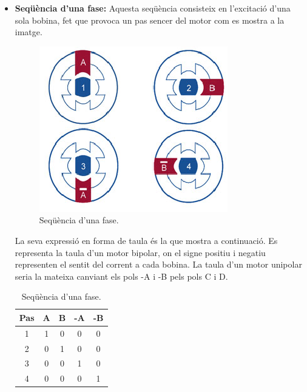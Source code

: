 \begin{itemize}
	\item \textbf{Seqüència d'una fase:} Aquesta seqüència consisteix en l'excitació d'una sola bobina, fet que provoca un pas sencer del motor com es mostra a la imatge.  
	\begin{figure}[H]
		\centering
		\includegraphics[scale=1.2]{Sequencia_1_fase.eps}
		\caption{Seqüència d'una fase.}
		\label{fig:1fase}
	\end{figure}
	La seva expressió en forma de taula és la que mostra a continuació. Es representa la taula d'un motor bipolar, on el signe positiu i negatiu representen el sentit del corrent a cada bobina. La taula d'un motor unipolar seria la mateixa canviant els pols -A i -B pels pols C i D.
	
	\begin{table}[H]
		\begin{center}
			\begin{tabular}{|c||c|c|c|c|}
				\hline
				Pas & A & B & -A & -B \\
				\hline \hline
				1 & 1 & 0 & 0 & 0 \\ \hline
				2 & 0 & 1 & 0 & 0 \\ \hline
				3 & 0 & 0 & 1 & 0 \\ \hline
				4 & 0 & 0 & 0 & 1 \\ \hline
			\end{tabular}
			\caption{Seqüència d'una fase.}
			\label{tabla:1fase}
		\end{center}
	\end{table}
	

\end{itemize}
